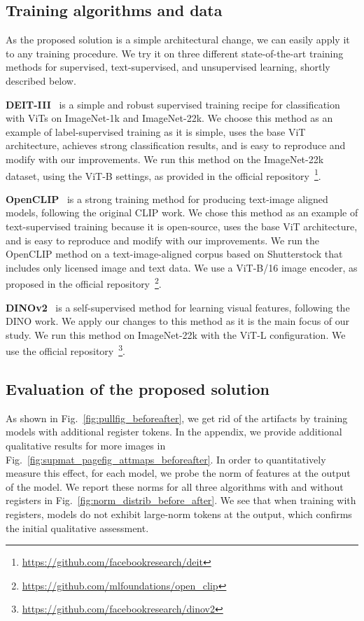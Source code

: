 \documentclass{article} \usepackage{iclr2024_conference,times}
\begin{document}
\subsection{Training algorithms and data}
\label{sec:algos}
As the proposed solution is a simple architectural change, we can easily apply it to any training procedure. 
We try it on three different state-of-the-art training methods for supervised, text-supervised, and unsupervised learning, shortly described below.

\textbf{DEIT-III}~\citep{touvron2022deit} is a simple and robust supervised training recipe for classification with ViTs on ImageNet-1k and ImageNet-22k.
We choose this method as an example of label-supervised training as it is simple, uses the base ViT architecture, achieves strong classification results, and is easy to reproduce and modify with our improvements. 
We run this method on the ImageNet-22k dataset, using the ViT-B settings, as provided in the official repository~\footnote{\url{https://github.com/facebookresearch/deit}}.

\textbf{OpenCLIP}~\citep{ilharco_gabriel_2021_5143773} is a strong training method for producing text-image aligned models, following the original CLIP work. 
We chose this method as an example of text-supervised training because it is open-source, uses the base ViT architecture, and is easy to reproduce and modify with our improvements. 
We run the OpenCLIP method on a text-image-aligned corpus based on Shutterstock that includes only licensed image and text data. 
We use a ViT-B/16 image encoder, as proposed in the official repository~\footnote{\url{https://github.com/mlfoundations/open_clip}}.

\textbf{DINOv2}~\citep{oquab2023dinov2} is a self-supervised method for learning visual features, following the DINO work.
We apply our changes to this method as it is the main focus of our study. 
We run this method on ImageNet-22k with the ViT-L configuration.
We use the official repository~\footnote{\url{https://github.com/facebookresearch/dinov2}}.



\subsection{Evaluation of the proposed solution}
As shown in Fig.~\ref{fig:pullfig_beforeafter}, we get rid of the artifacts by training models with additional register tokens.
In the appendix, we provide additional qualitative results for more images in Fig.~\ref{fig:supmat_pagefig_attmaps_beforeafter}.
In order to quantitatively measure this effect, for each model, we probe the norm of features at the output of the model. 
We report these norms for all three algorithms with and without registers in Fig.~\ref{fig:norm_distrib_before_after}.
We see that when training with registers, models do not exhibit large-norm tokens at the output, which confirms the initial qualitative assessment.
\end{document}
